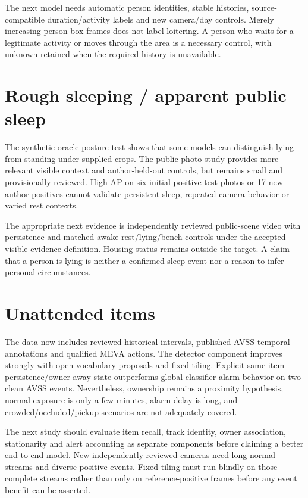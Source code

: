 The next model needs automatic person identities, stable histories, source-compatible duration/activity labels and new camera/day controls. Merely increasing person-box frames does not label loitering. A person who waits for a legitimate activity or moves through the area is a necessary control, with unknown retained when the required history is unavailable.

\section{Rough sleeping / apparent public sleep}
The synthetic oracle posture test shows that some models can distinguish lying from standing under supplied crops. The public-photo study provides more relevant visible context and author-held-out controls, but remains small and provisionally reviewed. High AP on six initial positive test photos or 17 new-author positives cannot validate persistent sleep, repeated-camera behavior or varied rest contexts.

The appropriate next evidence is independently reviewed public-scene video with persistence and matched awake-rest/lying/bench controls under the accepted visible-evidence definition. Housing status remains outside the target. A claim that a person is lying is neither a confirmed sleep event nor a reason to infer personal circumstances.

\section{Unattended items}
The data now includes reviewed historical intervals, published AVSS temporal annotations and qualified MEVA actions. The detector component improves strongly with open-vocabulary proposals and fixed tiling. Explicit same-item persistence/owner-away state outperforms global classifier alarm behavior on two clean AVSS events. Nevertheless, ownership remains a proximity hypothesis, normal exposure is only a few minutes, alarm delay is long, and crowded/occluded/pickup scenarios are not adequately covered.

The next study should evaluate item recall, track identity, owner association, stationarity and alert accounting as separate components before claiming a better end-to-end model. New independently reviewed cameras need long normal streams and diverse positive events. Fixed tiling must run blindly on those complete streams rather than only on reference-positive frames before any event benefit can be asserted.

